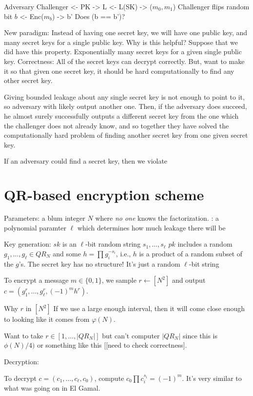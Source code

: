 \documentclass[10pt]{article}
\newcommand{\bit}{\{0,1\}}
\begin{document}
Adversary            Challenger
<- PK
-> L
<- L(SK)
-> ($m_0, m_1$)
Challenger flips random bit $b$
<- Enc($m_b$)
-> b'
Does (b == b')?

New paradigm: Instead of having one secret key, we will have one public key, and many secret keys for a single public key. Why is this helpful? Suppose that we did have this property. Exponentially many secret keys for a given single public key. Correctness: All of the secret keys can decrypt correctly. But, want to make it so that given one secret key, it should be hard computationally to find any other secret key.

Giving bounded leakage about any single secret key is not enough to point to it, so adversary with likely output another one. Then, if the adversary does succeed, he almost surely successfully outputs a different secret key from the one which the challenger does not already know, and so together they have solved the computationally hard problem of finding another secret key from one given secret key.

If an adversary could find a secret key, then we violate

\section{QR-based encryption scheme}

Parameters: a blum integer $N$ where \emph{no one} knows the factorization.
: a polynomial paramter $\ell$ which determines how much leakage there will be

Key generation:
$sk$ is an $\ell$-bit random string $s_1, \ldots, s_\ell$
$pk$ includes a random $g_1, \ldots, g_\ell \in QR_N$ and some $h = \prod g_i^{-s_i}$, i.e., $h$ is a product of a random subset of the $g$'s. The secret key has no structure! It's just a random $\ell$-bit string

To encrypt a message $m \in \bit$, we sample $r \leftarrow [N^2]$ and output $c = (g_1^r, \ldots, g_\ell^r, (-1)^mh^r)$.

Why $r$ in $[N^2]$ If we use a large enough interval, then it will come close enough to looking like it comes from $\varphi(N)$. 

Want to take $r \in [1, \ldots, |QR_N|]$ but can't computer $|QR_N|$ since this is $\phi(N)/4)$ or something like this [[need to check correctness].

Decryption:

To decrypt $c = (c_1, \ldots, c_\ell, c_0)$, compute $c_0 \prod c_i^{s_i} = (-1)^m$. It's very similar to what was going on in El Gamal.
\end{document}
